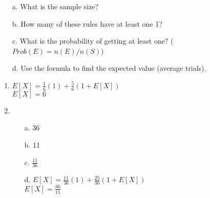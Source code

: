 {\begin{questionNOGRADE}{\thequestion}
        \begin{itemize}
            \item[a.]   What is the sample size?    ~\\ \vspace{1cm}
            \item[b.]   How many of these rules have at least one 1?    ~\\ \vspace{1cm}
            \item[c.]   What is the probability of getting at least one?  ($Prob(E) = n(E) / n(S)$) ~\\ \vspace{0.5cm}
            \item[d.]   Use the formula to find the expected value (average trials).
        \end{itemize}
    \end{questionNOGRADE}


}{

    \begin{enumerate}
        \item   $ E[X] = \frac{1}{6}(1) + \frac{5}{6}(1 + E[X]) $ \\ $ E[X] = 6 $
        \item
            \begin{itemize}
                \item[a.]   36
                \item[b.]   11
                \item[c.]   $\frac{11}{36}$
                \item[d.]    $ E[X] = \frac{11}{36}(1) + \frac{25}{36}(1 + E[X]) $ \\ $ E[X] = \frac{36}{11} $
            \end{itemize}
    \end{enumerate}

}


